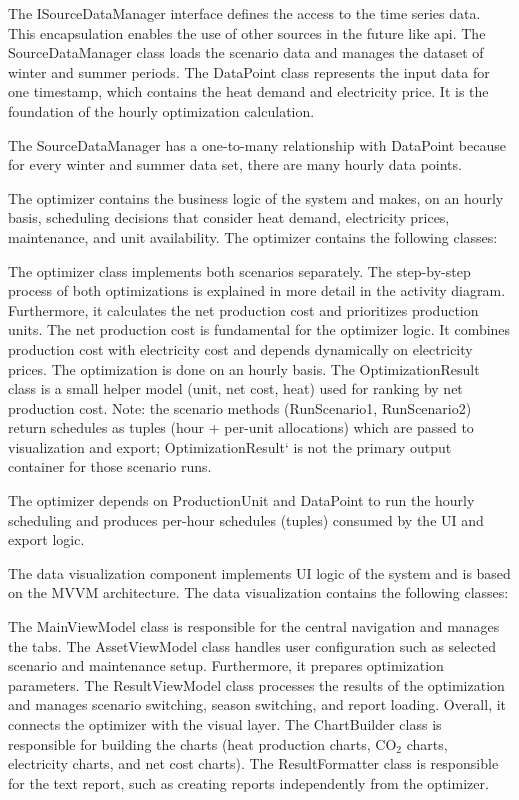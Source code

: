     The ISourceDataManager interface defines the access to the time series data. This encapsulation enables the use of other sources in the future like api. 
    The SourceDataManager class loads the scenario data and manages the dataset of winter and summer periods. 
    The DataPoint class represents the input data for one timestamp, which contains the heat demand and electricity price. It is the foundation of the hourly optimization calculation. 

The SourceDataManager has a one-to-many relationship with DataPoint because for every winter and summer data set, there are many hourly data points. 

The optimizer contains the business logic of the system and makes, on an hourly basis, scheduling decisions that consider heat demand, electricity prices, maintenance, and unit availability. 
The optimizer contains the following classes:

    The optimizer class implements both scenarios separately. The step-by-step process of both optimizations is explained in more detail in the activity diagram.  Furthermore, it calculates the net production cost and prioritizes production units. The net production cost is fundamental for the optimizer logic. It combines production cost with electricity cost and depends dynamically on electricity prices. The optimization is done on an hourly basis. 
    The OptimizationResult class is a small helper model (unit, net cost, heat) used for ranking by net production cost. Note: the scenario methods (RunScenario1, RunScenario2) return schedules as tuples (hour + per-unit allocations) which are passed to visualization and export; OptimizationResult` is not the primary output container for those scenario runs.

The optimizer depends on ProductionUnit and DataPoint to run the hourly scheduling and produces per-hour schedules (tuples) consumed by the UI and export logic.

The data visualization component implements UI logic of the system and is based on the MVVM architecture. 
The data visualization contains the following classes:

    The MainViewModel class is responsible for the central navigation and manages the tabs. 
    The AssetViewModel class handles user configuration such as selected scenario and maintenance setup. Furthermore, it prepares optimization parameters. 
    The ResultViewModel class processes the results of the optimization and manages scenario switching, season switching, and report loading. Overall, it connects the optimizer with the visual layer. 
    The ChartBuilder class is responsible for building the charts (heat production charts, CO$_2$ charts, electricity charts, and net cost charts).
    The ResultFormatter class is responsible for the text report, such as creating reports independently from the optimizer. 

